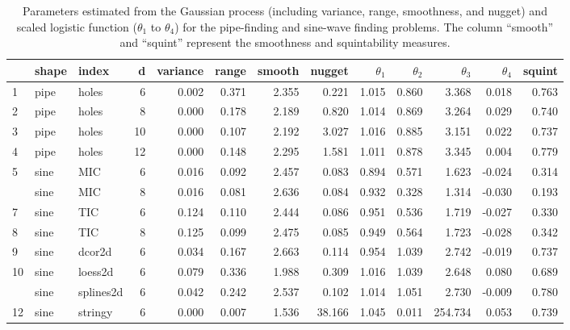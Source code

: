 \documentclass[
  number,
  preprint,
  3p]{elsarticle}
\begin{document}
\hypertarget{tbl-smoothness-squintability}{}
\begin{table}
\caption{\label{tbl-smoothness-squintability}Parameters estimated from the Gaussian process (including variance,
range, smoothness, and nugget) and scaled logistic function
(\(\theta_1\) to \(\theta_4\)) for the pipe-finding and sine-wave
finding problems. The column ``smooth'' and ``squint'' represent the
smoothness and squintability measures. }\tabularnewline

\centering\begingroup\fontsize{7}{9}\selectfont

\begin{tabular}{|>{}lll>{}r|rrr>{}r|rrr>{}r|>{}r|}
\toprule
  & shape & index & d & variance & range & smooth & nugget & $\theta_1$ & $\theta_2$ & $\theta_3$ & $\theta_4$ & squint\\
\midrule
1 & pipe & holes & 6 & 0.002 & 0.371 & 2.355 & 0.221 & 1.015 & 0.860 & 3.368 & 0.018 & 0.763\\
2 & pipe & holes & 8 & 0.000 & 0.178 & 2.189 & 0.820 & 1.014 & 0.869 & 3.264 & 0.029 & 0.740\\
3 & pipe & holes & 10 & 0.000 & 0.107 & 2.192 & 3.027 & 1.016 & 0.885 & 3.151 & 0.022 & 0.737\\
4 & pipe & holes & 12 & 0.000 & 0.148 & 2.295 & 1.581 & 1.011 & 0.878 & 3.345 & 0.004 & 0.779\\
5 & sine & MIC & 6 & 0.016 & 0.092 & 2.457 & 0.083 & 0.894 & 0.571 & 1.623 & -0.024 & 0.314\\
\addlinespace
6 & sine & MIC & 8 & 0.016 & 0.081 & 2.636 & 0.084 & 0.932 & 0.328 & 1.314 & -0.030 & 0.193\\
7 & sine & TIC & 6 & 0.124 & 0.110 & 2.444 & 0.086 & 0.951 & 0.536 & 1.719 & -0.027 & 0.330\\
8 & sine & TIC & 8 & 0.125 & 0.099 & 2.475 & 0.085 & 0.949 & 0.564 & 1.723 & -0.028 & 0.342\\
9 & sine & dcor2d & 6 & 0.034 & 0.167 & 2.663 & 0.114 & 0.954 & 1.039 & 2.742 & -0.019 & 0.737\\
10 & sine & loess2d & 6 & 0.079 & 0.336 & 1.988 & 0.309 & 1.016 & 1.039 & 2.648 & 0.080 & 0.689\\
\addlinespace
11 & sine & splines2d & 6 & 0.042 & 0.242 & 2.537 & 0.102 & 1.014 & 1.051 & 2.730 & -0.009 & 0.780\\
12 & sine & stringy & 6 & 0.000 & 0.007 & 1.536 & 38.166 & 1.045 & 0.011 & 254.734 & 0.053 & 0.739\\
\bottomrule
\end{tabular}
\endgroup{}
\end{table}
\end{document}
